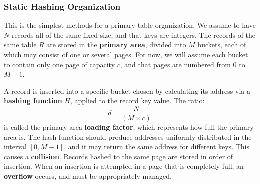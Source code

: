 \subsubsection{Static Hashing Organization}

This is the simplest methods for a primary table organization. We assume to have $N$ records all of the same fixed size, and that keys are integers. The records of the same table $R$ are stored in the \textbf{primary area}, divided into $M$ buckets, each of which may consist of one or several pages. For now, we will assume each bucket to contain only one page of capacity $c$, and that pages are numbered from $0$ to $M-1$.

A record is inserted into a specific bucket chosen by calculating its address via a \textbf{hashing function} $H$, applied to the record key value. The ratio:
\begin{equation*}
    d = \dfrac{N}{(M \times c)}
\end{equation*}
is called the primary area \textbf{loading factor}, which represents how full the primary area is. The hash function should produce addresses uniformly distributed in the interval $[0, M-1]$, and it may return the same address for different keys. This causes a \textbf{collision}. Records hashed to the same page are stored in order of insertion. When an insertion is attempted in a page that is completely full, an \textbf{overflow} occurs, and must be appropriately managed.

